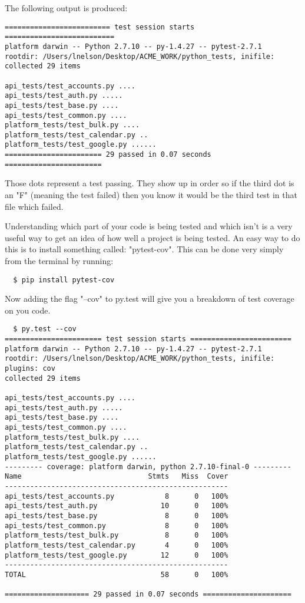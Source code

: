 The following output is produced:

\begin{lstlisting}
========================= test session starts ==========================
platform darwin -- Python 2.7.10 -- py-1.4.27 -- pytest-2.7.1
rootdir: /Users/lnelson/Desktop/ACME_WORK/python_tests, inifile:
collected 29 items

api_tests/test_accounts.py ....
api_tests/test_auth.py .....
api_tests/test_base.py ....
api_tests/test_common.py ....
platform_tests/test_bulk.py ....
platform_tests/test_calendar.py ..
platform_tests/test_google.py ......
======================= 29 passed in 0.07 seconds =======================
\end{lstlisting}
\begin{info}
Those dots represent a test passing. They show up in order so if the third dot is an "F" (meaning the test failed) then you know it would be the third test in that file which failed.
\end{info}

Understanding which part of your code is being tested and which isn't is a very useful way to get an idea of how well a project is being tested.
An easy way to do this is to install something called: "pytest-cov". This can be done very simply from the terminal by running:
\begin{lstlisting}
  $ pip install pytest-cov
\end{lstlisting}
Now adding the flag "--cov" to py.test will give you a breakdown of test coverage on you code.
\begin{lstlisting}
  $ py.test --cov
======================= test session starts ========================
platform darwin -- Python 2.7.10 -- py-1.4.27 -- pytest-2.7.1
rootdir: /Users/lnelson/Desktop/ACME_WORK/python_tests, inifile:
plugins: cov
collected 29 items

api_tests/test_accounts.py ....
api_tests/test_auth.py .....
api_tests/test_base.py ....
api_tests/test_common.py ....
platform_tests/test_bulk.py ....
platform_tests/test_calendar.py ..
platform_tests/test_google.py ......
--------- coverage: platform darwin, python 2.7.10-final-0 ---------
Name                              Stmts   Miss  Cover
-----------------------------------------------------
api_tests/test_accounts.py            8      0   100%
api_tests/test_auth.py               10      0   100%
api_tests/test_base.py                8      0   100%
api_tests/test_common.py              8      0   100%
platform_tests/test_bulk.py           8      0   100%
platform_tests/test_calendar.py       4      0   100%
platform_tests/test_google.py        12      0   100%
-----------------------------------------------------
TOTAL                                58      0   100%

==================== 29 passed in 0.07 seconds =====================
\end{lstlisting}

